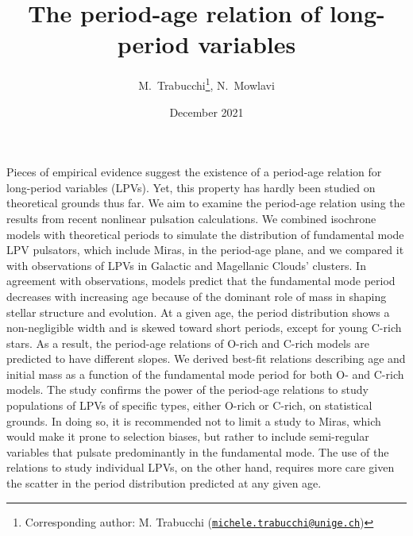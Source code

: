\documentclass[letter]{aa}
\begin{document}
 

  \title{The period-age relation of long-period variables}
  \subtitle{}


\author{M.~Trabucchi\inst{\ref{inst_gen}}\fnmsep\thanks{Corresponding author: M. Trabucchi (\href{mailto:michele.trabucchi@unige.ch}{\tt michele.trabucchi@unige.ch})},
N.~Mowlavi\inst{\ref{inst_gen}}
}
\date{December 2021}


\abstract
{Pieces of empirical evidence suggest the existence of a period-age relation for long-period variables (LPVs). Yet, this property has hardly been studied on theoretical grounds thus far.}
{We aim to examine the period-age relation using the results from recent nonlinear pulsation calculations.}
{We combined isochrone models with theoretical periods to simulate the distribution of fundamental mode LPV pulsators, which include Miras, in the period-age plane, and we compared it with observations of LPVs in Galactic and Magellanic Clouds' clusters.}
{In agreement with observations, models predict that the fundamental mode period decreases with increasing age because of the dominant role of mass in shaping stellar structure and evolution. At a given age, the period distribution shows a non-negligible width and is skewed toward short periods, except for young C-rich stars. As a result, the period-age relations of O-rich and C-rich models are predicted to have different slopes. We derived best-fit relations describing age and initial mass as a function of the fundamental mode period for both O- and C-rich models.}
{The study confirms the power of the period-age relations to study populations of LPVs of specific types, either O-rich or C-rich, on statistical grounds. In doing so, it is recommended not to limit a study to Miras, which would make it prone to selection biases, but rather to include semi-regular variables that pulsate predominantly in the fundamental mode. The use of the relations to study individual LPVs, on the other hand, requires more care given the scatter in the period distribution predicted at any given age.}


\maketitle
\end{document}
